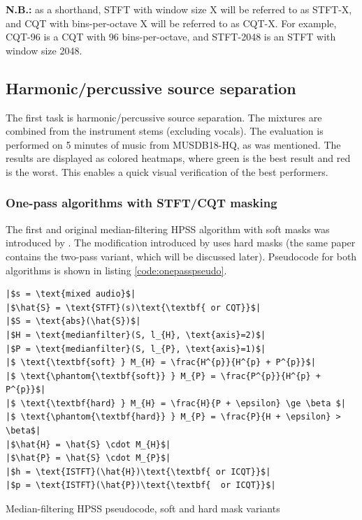 \documentclass[letter,12pt]{article}
\newlength{\mintednumbersep}
\begin{document}
\textbf{N.B.:} as a shorthand, STFT with window size X will be referred to as STFT-X, and CQT with bins-per-octave X will be referred to as CQT-X. For example, CQT-96 is a CQT with 96 bins-per-octave, and STFT-2048 is an STFT with window size 2048.

\subsection{Harmonic/percussive source separation}

The first task is harmonic/percussive source separation. The mixtures are combined from the instrument stems (excluding vocals). The evaluation is performed on 5 minutes of music from MUSDB18-HQ, as was mentioned. The results are displayed as colored heatmaps, where green is the best result and red is the worst. This enables a quick visual verification of the best performers.

\subsubsection{One-pass algorithms with STFT/CQT masking}

The first and original median-filtering HPSS algorithm with soft masks was introduced by \citet{fitzgerald1}. The modification introduced by \citet{driedger} uses hard masks (the same paper contains the two-pass variant, which will be discussed later). Pseudocode for both algorithms is shown in listing \ref{code:onepasspseudo}.

\begin{listing}[h]
\setlength\partopsep{-\topsep}
\begin{verbatim}
|$s = \text{mixed audio}$|
|$\hat{S} = \text{STFT}(s)\text{\textbf{ or CQT}}$|
|$S = \text{abs}(\hat{S})$|
|$H = \text{medianfilter}(S, l_{H}, \text{axis}=2)$|
|$P = \text{medianfilter}(S, l_{P}, \text{axis}=1)$|
|$ \text{\textbf{soft} } M_{H} = \frac{H^{p}}{H^{p} + P^{p}}$|
|$ \text{\phantom{\textbf{soft}} } M_{P} = \frac{P^{p}}{H^{p} + P^{p}}$|
|$ \text{\textbf{hard} } M_{H} = \frac{H}{P + \epsilon} \ge \beta $|
|$ \text{\phantom{\textbf{hard}} } M_{P} = \frac{P}{H + \epsilon} > \beta$|
|$\hat{H} = \hat{S} \cdot M_{H}$|
|$\hat{P} = \hat{S} \cdot M_{P}$|
|$h = \text{ISTFT}(\hat{H})\text{\textbf{ or ICQT}}$|
|$p = \text{ISTFT}(\hat{P})\text{\textbf{  or ICQT}}$|
\end{verbatim}
\caption{Median-filtering HPSS pseudocode, soft and hard mask variants}
\label{code:onepasspseudo}
\end{listing}
\end{document}
